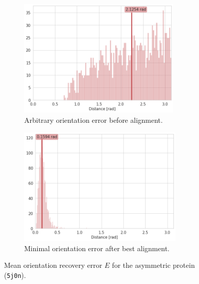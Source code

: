 \begin{figure}
    \centering
    \begin{subfigure}[b]{0.45\textwidth}
        \includegraphics[height=5.7cm]{images/5j0n_noise0_angle_alignment_before.png}
        \caption{Arbitrary orientation error before alignment.}
    \end{subfigure}
    \hfill
    \begin{subfigure}[b]{0.5\textwidth}
    \centering
        \includegraphics[height=5.7cm]{images/5j0n_noise0_angle_alignment_after.png}
        \caption{Minimal orientation error after best alignment.}
    \end{subfigure}
    \caption{
        Mean orientation recovery error $E$ for the asymmetric protein (\texttt{5j0n}).
    }
    \label{fig:angle-alignment-5j0n-noise0}
\end{figure}

